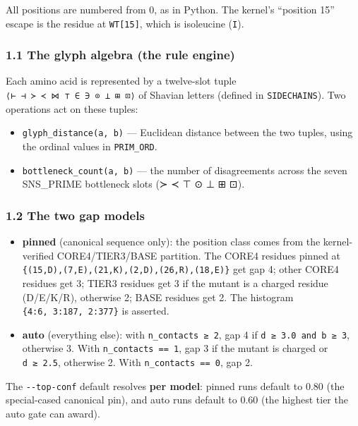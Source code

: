 All positions are numbered from 0, as in Python. The kernel's ``position
15'' escape is the residue at \texttt{WT{[}15{]}}, which is isoleucine
(\texttt{\textquotesingle{}I\textquotesingle{}}).

\hypertarget{the-glyph-algebra-the-rule-engine}{%
\subsubsection{1.1 The glyph algebra (the rule
engine)}\label{the-glyph-algebra-the-rule-engine}}

Each amino acid is represented by a twelve-slot tuple
\texttt{⟨⊢\ ⊣\ ≻\ ≺\ ⋈\ ⊤\ ∈\ ∋\ ⊙\ ⊥\ ⊞\ ⊡⟩} of Shavian letters
(defined in \texttt{SIDECHAINS}). Two operations act on these tuples:

\begin{itemize}
\tightlist
\item
  \texttt{glyph\_distance(a,\ b)} --- Euclidean distance between the two
  tuples, using the ordinal values in \texttt{PRIM\_ORD}.
\item
  \texttt{bottleneck\_count(a,\ b)} --- the number of disagreements
  across the seven SNS\_PRIME bottleneck slots (≻ ≺ ⊤ ⊙ ⊥ ⊞ ⊡).
\end{itemize}

\hypertarget{the-two-gap-models}{%
\subsubsection{1.2 The two gap models}\label{the-two-gap-models}}

\begin{itemize}
\tightlist
\item
  \textbf{pinned} (canonical sequence only): the position class comes
  from the kernel-verified CORE4/TIER3/BASE partition. The CORE4
  residues pinned at
  \texttt{\{(15,D),(7,E),(21,K),(2,D),(26,R),(18,E)\}} get gap 4; other
  CORE4 residues get 3; TIER3 residues get 3 if the mutant is a charged
  residue (D/E/K/R), otherwise 2; BASE residues get 2. The histogram
  \texttt{\{4:6,\ 3:187,\ 2:377\}} is asserted.
\item
  \textbf{auto} (everything else): with \texttt{n\_contacts\ ≥\ 2}, gap
  4 if \texttt{d\ ≥\ 3.0\ and\ b\ ≥\ 3}, otherwise 3. With
  \texttt{n\_contacts\ ==\ 1}, gap 3 if the mutant is charged or
  \texttt{d\ ≥\ 2.5}, otherwise 2. With \texttt{n\_contacts\ ==\ 0}, gap
  2.
\end{itemize}

The \texttt{-\/-top-conf} default resolves \textbf{per model}: pinned
runs default to 0.80 (the special-cased canonical pin), and auto runs
default to 0.60 (the highest tier the auto gate can award).

